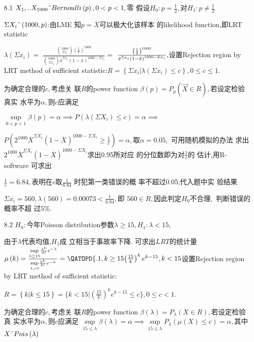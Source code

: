 \documentclass{article}
\begin{document}
8.1 $X_{1},..X_{1000}\symbol{126}Bernoulli\left( p\right) ,0<p<1,$零%
假设$H_{0}:p=\frac{1}{2},$对$H_{1}:p\neq \frac{1}{2}$

$\Sigma X_{i}\symbol{126}\left( 1000,p\right) $:由LME 知$p=%
\overline{X}$可以极大化该样本%
的likelihood function,即LRT statistic

$\lambda \left( \Sigma x_{i}\right) =$ $\frac{\binom{1000}{\Sigma x_{i}}%
\left( \frac{1}{2}\right) ^{1000}}{\binom{1000}{\Sigma x_{i}}\bar{x}^{\Sigma
x_{i}}\left( 1-\bar{x}\right) ^{1000-\Sigma x_{i}}}=$ $\frac{\left( \frac{1}{%
2}\right) ^{1000}}{\bar{x}^{\Sigma x_{i}}\left( 1-\bar{x}\right)
^{1000-\Sigma x_{i}}},$设置Rejection region by LRT method of
sufficient statistic:$R=\left\{ \Sigma x_{i}|\lambda \left( \Sigma
x_{i}\right) \leq c\right\} ,0\leq c\leq 1.$

为确定合理的$c,$考虑关%
联$R$的power function $\beta \left( p\right) =P_{p}\left( \vec{X}%
\in R\right) ,$若设定检验真实%
水平为$\alpha ,$则$c$应满足

$\underset{0<p<1}{\sup }\beta \left( p\right) =\alpha \implies P\left(
\lambda \left( \Sigma X_{i}\right) \leq c\right) =\alpha \implies $

$P\left( 2^{1000}\overline{X}^{\Sigma X_{i}}\left( 1-\overline{X}\right)
^{1000-\Sigma X_{i}}\geq \frac{1}{c}\right) =\alpha ,$取$\alpha =0.05,$%
可用随机模拟的办法%
求出$2^{1000}\overline{X}^{\Sigma X_{i}}\left( 1-\overline{X}%
\right) ^{1000-\Sigma X_{i}}$求出0.95所对应%
的分位数即为对$\frac{1}{c}$的%
估计,用R-software 可求出

$\frac{1}{c}=6.84,$表明在$c$取$\frac{1}{6.84}$%
时犯第一类错误的概%
率不超过0.05,代入题中实%
验结果

$\Sigma x_{i}=560,\lambda \left( 560\right) =0.00073<\frac{1}{6.84},$即%
$560\in R,$因此判定$H_{0}$不合理$,$%
判断错误的概率不超%
过$5\%.$

8.2 $H_{0}:$今年Poisson distribution参数$\lambda
\geq 15,H_{1}:\lambda <15,$

由于$\lambda $代表均值,$H_{1}$成%
立相当于事故率下降. 
可求出$LRT$的统计量$\mu \left(
k\right) =\frac{\underset{\lambda \geq 15}{\sup }\frac{\lambda ^{k}}{k!}%
e^{-\lambda }}{\underset{\lambda >0}{\sup }\frac{\lambda ^{k}}{k!}%
e^{-\lambda }}=\QATOPD\{ . {1,k\geq 15}{\left( \frac{15}{k}\right)
^{k}e^{k-15},k<15}$设置Rejection region by LRT method of
sufficient statistic:

$R=\left\{ k|k\leq 15\right\} =\{k<15|\left( \frac{15}{k}\right)
^{k}e^{k-15}\leq c\},0\leq c<1.$

为确定合理的$c,$考虑关%
联$R$的power function $\beta \left( \lambda \right) =P_{\lambda
}\left( X\in R\right) ,$若设定检验真%
实水平为$\alpha ,$则$c$应满足%
$\underset{15\leq \lambda }{\sup }\beta \left( \lambda \right) =\alpha
\implies \underset{15\leq \lambda }{\sup }P_{\lambda }\left( \mu \left(
X\right) \leq c\right) =\alpha ,$其中$X\symbol{126}Pois\left(
\lambda \right) $
\end{document}
